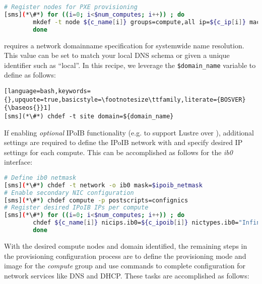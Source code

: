 \begin{lstlisting}[language=bash,keywords={},upquote=true,basicstyle=\footnotesize\ttfamily,]
# Register nodes for PXE provisioning 
[sms](*\#*) for ((i=0; i<$num_computes; i++)) ; do
		mkdef -t node ${c_name[i]} groups=compute,all ip=${c_ip[i]} mac=${c_mac[i]} netboot=pxe
        done
\end{lstlisting}

\noindent \xCAT{} requires a network domainname specification for systemwide name
resolution. This value can be set to match your local DNS schema or given a
unique identifier such as ``local''. In this recipe, we leverage the
\texttt{\$domain\_name} variable to define as follows:

\begin{lstlisting}[language=bash,keywords={},upquote=true,basicstyle=\footnotesize\ttfamily,literate={BOSVER}{\baseos{}}1]
[sms](*\#*) chdef -t site domain=${domain_name}
\end{lstlisting}

\clearpage
If enabling {\em optional} IPoIB functionality (e.g. to support Lustre over \InfiniBand{}), additional
settings are required to define the IPoIB network with \xCAT{} and specify
desired IP settings for each compute. This can be accomplished as follows for
the {\em ib0} interface:

\begin{lstlisting}[language=bash,keywords={},upquote=true,basicstyle=\footnotesize\ttfamily]
# Define ib0 netmask
[sms](*\#*) chdef -t network -o ib0 mask=$ipoib_netmask
# Enable secondary NIC configuration
[sms](*\#*) chdef compute -p postscripts=confignics  
# Register desired IPoIB IPs per compute
[sms](*\#*) for ((i=0; i<$num_computes; i++)) ; do
		chdef ${c_name[i]} nicips.ib0=${c_ipoib[i]} nictypes.ib0="InfiniBand" nicnetworks.ib0=ib0
        done
\end{lstlisting}

With the desired compute nodes and domain identified, the remaining steps in the
provisioning configuration process are to define the provisioning mode and
image for the {\em compute} group and use \xCAT{} commands to complete
configuration for network services like DNS and DHCP. These tasks are
accomplished as follows:

